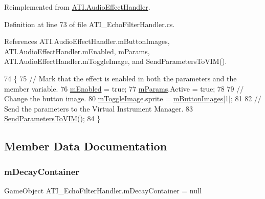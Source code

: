 Reimplemented from \hyperlink{class_a_t_i_1_1_audio_effect_handler_abccfc2e809d0d6b643704f7391461cd7}{A\+T\+I.\+Audio\+Effect\+Handler}.



Definition at line 73 of file A\+T\+I\+\_\+\+Echo\+Filter\+Handler.\+cs.



References A\+T\+I.\+Audio\+Effect\+Handler.\+m\+Button\+Images, A\+T\+I.\+Audio\+Effect\+Handler.\+m\+Enabled, m\+Params, A\+T\+I.\+Audio\+Effect\+Handler.\+m\+Toggle\+Image, and Send\+Parameters\+To\+V\+I\+M().


\begin{DoxyCode}
74     \{
75         \textcolor{comment}{// Mark that the effect is enabled in both the parameters and the member variable.}
76         \hyperlink{class_a_t_i_1_1_audio_effect_handler_a378c463b827ad6e41d09a4ec2caff351}{mEnabled} = \textcolor{keyword}{true};
77         \hyperlink{class_a_t_i___echo_filter_handler_afe435170679cf364951083e6f6ffab36}{mParams}.Active = \textcolor{keyword}{true};
78 
79         \textcolor{comment}{// Change the button image.}
80         \hyperlink{class_a_t_i_1_1_audio_effect_handler_aa5bf03976a14594f089aac5681c15a83}{mToggleImage}.sprite = \hyperlink{class_a_t_i_1_1_audio_effect_handler_a6e1cfd5449b82870eacd7404a158c7a7}{mButtonImages}[1];
81 
82         \textcolor{comment}{// Send the parameters to the Virtual Instrument Manager.}
83         \hyperlink{class_a_t_i___echo_filter_handler_afacef95c6ac470707d2bd092031efac0}{SendParametersToVIM}();
84     \}
\end{DoxyCode}


\subsection{Member Data Documentation}
\mbox{\label{class_a_t_i___echo_filter_handler_a4e5a10c78852a38c5a6065efdf3f04f8}} 
\subsubsection{\texorpdfstring{m\+Decay\+Container}{mDecayContainer}}
{\footnotesize\ttfamily Game\+Object A\+T\+I\+\_\+\+Echo\+Filter\+Handler.\+m\+Decay\+Container = null\hspace{0.3cm}{\ttfamily [private]}}



